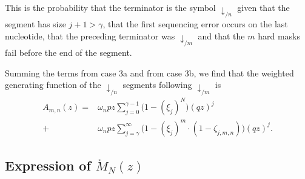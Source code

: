\documentclass{article}
\begin{document}
This is the probability that the terminator is the symbol
$\downarrow_{/n}$ given that the segment has size $j+1 > \gamma$, that
the first sequencing error occurs on the last nucleotide, that the
preceding terminator was $\downarrow_{/m}$ and that the $m$ hard masks
fail before the end of the segment.

Summing the terms from case 3a and from case 3b, we find that the weighted
generating function of the $\downarrow_{/n}$ segments following
$\downarrow_{/m}$ is
\begin{equation}
\begin{split}
\label{eq:A}
A_{m,n}(z) =
&\omega_n pz \sum_{j=0}^{\gamma-1} \Big(1 - (\xi_j)^N \Big)
  (qz)^j \\
+ &\omega_n pz \sum_{j=\gamma}^\infty \Big(1 - (\xi_j)^m \cdot
(1- \zeta_{j,m,n}) \Big) (qz)^j.
\end{split}
\end{equation}

\subsection{Expression of $\mathring{M}_N(z)$}
\label{sec:expression_of_M}
\end{document}
